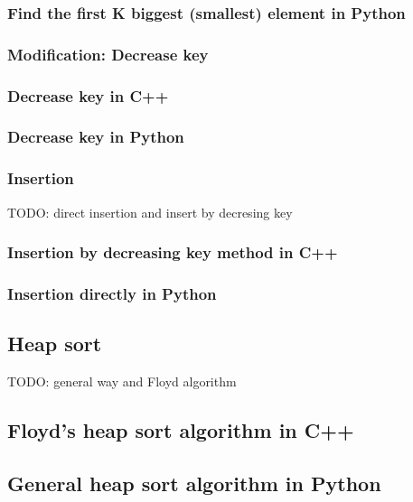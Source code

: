 \documentclass{article}
\begin{document}
\subsubsection*{Find the first K biggest (smallest) element in Python}

\subsubsection{Modification: Decrease key}

\subsubsection*{Decrease key in C++}

\subsubsection*{Decrease key in Python}

\subsubsection{Insertion}

TODO: direct insertion and insert by decresing key

\subsubsection*{Insertion by decreasing key method in C++}

\subsubsection*{Insertion directly in Python}

\subsection{Heap sort}

TODO: general way and Floyd algorithm

\subsection*{Floyd's heap sort algorithm in C++}

\subsection*{General heap sort algorithm in Python}
\end{document}
